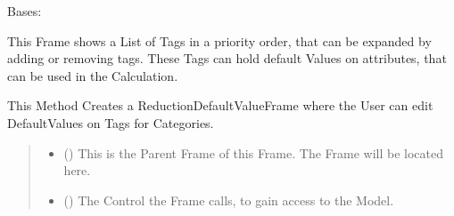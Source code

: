 \documentclass[letterpaper,10pt,english]{sphinxmanual}
\begin{document}
\begin{fulllineitems}
\label{\detokenize{apidoc/src.osm_configurator.view.utilityframes:src.osm_configurator.view.utilityframes.reduction_default_value_frame.ReductionDefaultValueFrame}}
\pysigstartsignatures
{}
\pysigstopsignatures
\sphinxAtStartPar
Bases: 

\sphinxAtStartPar
This Frame shows a List of Tags in a priority order, that can be expanded by adding or removing tags.
These Tags can hold default Values on attributes, that can be used in the Calculation.

\begin{fulllineitems}
\label{\detokenize{apidoc/src.osm_configurator.view.utilityframes:src.osm_configurator.view.utilityframes.reduction_default_value_frame.ReductionDefaultValueFrame.__init__}}
\pysigstartsignatures
{}
\pysigstopsignatures
\sphinxAtStartPar
This Method Creates a ReductionDefaultValueFrame where the User can edit Default\sphinxhyphen{}Values on Tags for
Categories.
\begin{quote}\begin{description}
\begin{itemize}
\item {} 
\sphinxAtStartPar
{} ({\hyperref[\detokenize{apidoc/src.osm_configurator.view.toplevelframes:src.osm_configurator.view.toplevelframes.reduction_frame.ReductionFrame}]{}}) \textendash{} This is the Parent Frame of this Frame. The Frame will be located here.

\item {} 
\sphinxAtStartPar
{} ({\hyperref[\detokenize{apidoc/src.osm_configurator.control:src.osm_configurator.control.control_interface.IControl}]{}}) \textendash{} The Control the Frame calls, to gain access to the Model.

\end{itemize}

\end{description}\end{quote}

\end{fulllineitems}


\end{fulllineitems}
\end{document}
